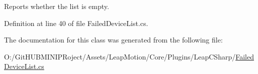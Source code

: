 Reports whether the list is empty. 



Definition at line 40 of file Failed\+Device\+List.\+cs.



The documentation for this class was generated from the following file\+:\begin{DoxyCompactItemize}
\item 
O\+:/\+Git\+H\+U\+B\+M\+I\+N\+I\+P\+Roject/\+Assets/\+Leap\+Motion/\+Core/\+Plugins/\+Leap\+C\+Sharp/\mbox{\hyperlink{_failed_device_list_8cs}{Failed\+Device\+List.\+cs}}\end{DoxyCompactItemize}
